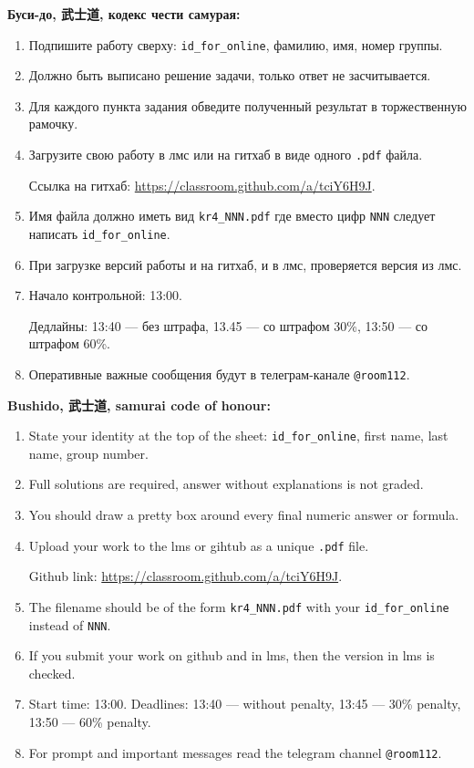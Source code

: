 \documentclass[12pt]{article}
\begin{document}
\vspace{20mm}

\textbf{Буси-до, 武士道, кодекс чести самурая:}

\vspace{5mm}

\begin{enumerate}
\item Подпишите работу сверху: \verb|id_for_online|, фамилию, имя, номер группы.
\item Должно быть выписано решение задачи, только ответ не засчитывается.
\item Для каждого пункта задания обведите полученный результат в торжественную рамочку.
\item Загрузите свою работу в лмс или на гитхаб в виде одного \verb|.pdf| файла.

Ссылка на гитхаб: \url{https://classroom.github.com/a/tciY6H9J}.
\item Имя файла должно иметь вид \verb|kr4_NNN.pdf| где вместо цифр \verb|NNN| следует написать \verb|id_for_online|.
\item При загрузке версий работы и на гитхаб, и в лмс, проверяется версия из лмс. 
\item Начало контрольной: 13:00. 

Дедлайны: 13:40 — без штрафа, 13.45 — со штрафом 30\%, 13:50 — со штрафом 60\%.
\item Оперативные важные сообщения будут в телеграм-канале \verb|@room112|.
\end{enumerate}

\vspace{20mm}

\textbf{Bushido, 武士道, samurai code of honour:}

\vspace{5mm}

\begin{enumerate}
\item State your identity at the top of the sheet: \verb|id_for_online|, first name, last name, group number.
\item Full solutions are required, answer without explanations is not graded. 
\item You should draw a pretty box around every final numeric answer or formula.
\item Upload your work to the lms or gihtub as a unique \verb|.pdf| file.

Github link: \url{https://classroom.github.com/a/tciY6H9J}.
\item The filename should be of the form \verb|kr4_NNN.pdf| with your \verb|id_for_online| instead of \verb|NNN|.
\item If you submit your work on github and in lms, then the version in lms is checked.
\item Start time: 13:00. Deadlines: 13:40 — without penalty, 13:45 — 30\% penalty, 13:50 — 60\% penalty.
\item For prompt and important messages read the telegram channel \verb|@room112|.
\end{enumerate}
\end{document}
